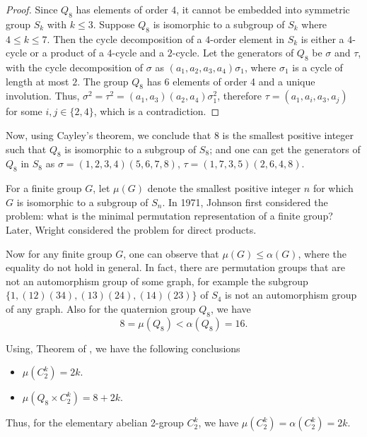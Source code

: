 \documentclass[12pt]{article}
\theoremstyle{plain}
\theoremstyle{definition}
\begin{document}
	\begin{proof}
		Since $Q_{8}$ has elements of order $4$, it cannot be embedded into symmetric group $S_{k}$ with $k \leq 3$. Suppose $Q_{8}$ is isomorphic to a subgroup of $S_{k}$ where $4 \leq k \leq 7$. Then the cycle decomposition of a $4$-order element in $S_{k}$ is either a $4$-cycle or a product of a $4$-cycle and a $2$-cycle. Let the generators of $Q_{8}$ be $\sigma$ and $\tau$, with the cycle decomposition of $\sigma$ as $(a_{1}, a_{2}, a_{3}, a_{4})\sigma_{1}$, where $\sigma_{1}$ is a cycle of length at most $2$. The group $Q_{8}$ has 6 elements of order 4 and a unique involution. Thus, $\sigma^{2} = \tau^{2} = (a_{1}, a_{3})(a_{2}, a_{4}) \sigma_{1}^{2}$, therefore $\tau = (a_{1}, a_{i}, a_{3}, a_{j})$ for some $i,j \in  \{2,4\}$, which is a contradiction.
	\end{proof}
	
	Now, using Cayley's theorem, we conclude that 8 is the smallest positive integer such that $Q_8$ is isomorphic to a subgroup of $S_8$; and one can get the generators of $Q_8$ in $S_8$ as $\sigma=(1,2,3,4)(5,6,7,8)$, $\tau=(1,7,3,5)(2,6,4,8)$. 
	
	For a finite group $G$, let $\mu(G)$ denote the smallest positive integer $n$ for which $G$ is isomorphic to a subgroup of $S_n$. In 1971, Johnson \cite{jh} first considered the problem: what is the minimal permutation representation of a finite group? Later, Wright \cite{wd} considered the problem for direct products.
	
	Now for any finite group $G$, one can observe that $\mu(G)\leq\alpha(G)$, where the equality do not hold in general. In fact, there are permutation groups that are not an automorphism group of some graph, for example the subgroup $\{1, (12)(34),(13)(24),(14)(23)\}$ of $S_4$ is not an automorphism group of any graph. Also for the quaternion group $Q_8$, we have $$8=\mu(Q_8)<\alpha(Q_8)=16.$$
	
	Using, Theorem of \cite{wd}, we have the following conclusions
	\begin{itemize}
		\item
		$\mu(C_2^k)=2k$.
		\item
		$\mu(Q_8\times C_2^k)=8+2k$.
	\end{itemize}   
	
	Thus, for the elementary abelian 2-group $C_2^k$, we have $\mu(C_2^k)=\alpha(C_2^k)=2k$.
	
\end{document}
